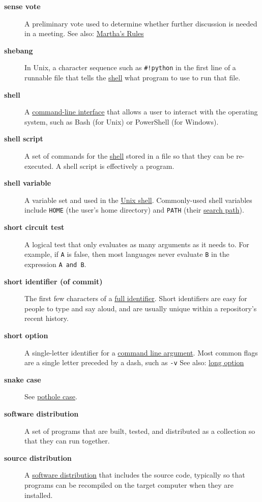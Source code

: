 \documentclass[
]{krantz}
\begin{document}
\begin{description}
\item[\textbf{sense vote}]
A preliminary vote used to determine whether further discussion is needed in a meeting. See also: \protect\hyperlink{marthas_rules}{Martha's Rules}
\item[\textbf{shebang}]
In Unix, a character sequence such as \texttt{\#!python} in the first line of a runnable file that tells the \protect\hyperlink{shell}{shell} what program to use to run that file.
\item[\textbf{shell}]
A \protect\hyperlink{cli}{command-line interface} that allows a user to interact with the operating system, such as Bash (for Unix) or PowerShell (for Windows).
\item[\textbf{shell script}]
A set of commands for the \protect\hyperlink{shell}{shell} stored in a file so that they can be re-executed. A shell script is effectively a program.
\item[\textbf{shell variable}]
A variable set and used in the \protect\hyperlink{shell}{Unix shell}. Commonly-used shell variables include \texttt{HOME} (the user's home directory) and \texttt{PATH} (their \protect\hyperlink{search_path}{search path}).
\item[\textbf{short circuit test}]
A logical test that only evaluates as many arguments as it needs to. For example, if \texttt{A} is false, then most languages never evaluate \texttt{B} in the expression \texttt{A\ and\ B}.
\item[\textbf{short identifier (of commit)}]
The first few characters of a \protect\hyperlink{full_identifier_git}{full identifier}. Short identifiers are easy for people to type and say aloud, and are usually unique within a repository's recent history.
\item[\textbf{short option}]
A single-letter identifier for a \protect\hyperlink{command_line_argument}{command line argument}. Most common flags are a single letter preceded by a dash, such as \texttt{-v} See also: \protect\hyperlink{long_option}{long option}
\item[\textbf{snake case}]
See \protect\hyperlink{pothole_case}{pothole case}.
\item[\textbf{software distribution}]
A set of programs that are built, tested, and distributed as a collection so that they can run together.
\item[\textbf{source distribution}]
A \protect\hyperlink{software_distribution}{software distribution} that includes the source code, typically so that programs can be recompiled on the target computer when they are installed.

\end{description}
\end{document}
